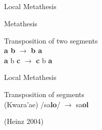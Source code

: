 \documentclass[professionalfonts, xcolor={usenames,svgnames,x11names,table}]{beamer}
\begin{document}
	\subsection{}
	\begin{frame}{Local Metathesis}
		\begin{block}{Metathesis}
			\begin{center}
				Transposition of two segments \\
				\vspace{3mm}
			   \textbf{a b} \hspace{5mm} $\rightarrow$ \hspace{5mm} \textbf{b a} \\
			   \textbf{a }b \textbf{c} \hspace{5mm} $\rightarrow$ \hspace{5mm} \textbf{c }b \textbf{a}
		    \end{center}
		 \end{block}
	 
	 \pause
		\begin{block}{Local Metathesis}
			\begin{center}
				Transposition of  segments \\
				\vspace{3mm}
				(Kwara'ae)  \hspace{5mm}  /sa\textbf{lo}/ \hspace{5mm}	$\rightarrow$ \hspace{5mm}   sa\textbf{ol}	\\
					\begin{flushright}
					(Heinz 2004)
					\end{flushright}
			\end{center}										
		\end{block}
	\end{frame}
	
\end{document}
